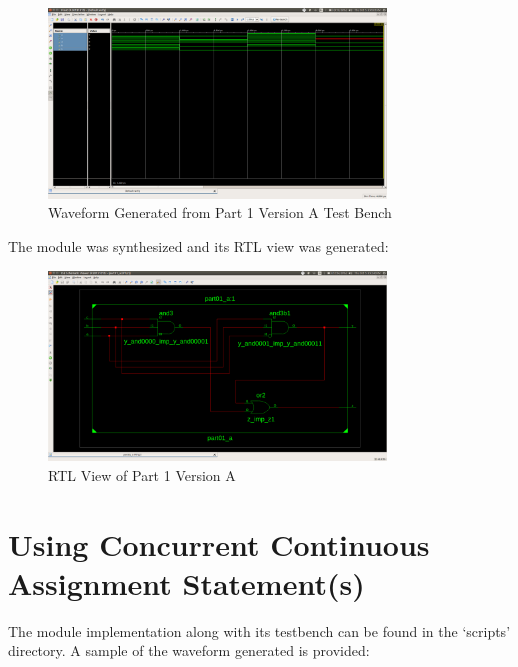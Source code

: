 \documentclass[paper=usletter, fontsize=12pt]{article}
\begin{document}
    \begin{figure}[ht]
        \begin{center}
            \includegraphics[width=0.8\textwidth]{version_a_wav.png}
            \caption{Waveform Generated from Part 1 Version A Test Bench} \label{fig:a_wav}
        \end{center}
    \end{figure}

    The module was synthesized and its RTL view was generated:
    \begin{figure}[ht]
        \begin{center}
            \includegraphics[width=0.8\textwidth]{version_a.png}
            \caption{RTL View of Part 1 Version A} \label{fig:a_rtl}
        \end{center}
    \end{figure}

    \section{Using Concurrent Continuous Assignment Statement(s)}
    The module implementation along with its testbench can be found in the `scripts' directory. A sample of the waveform generated is provided:
\end{document}
